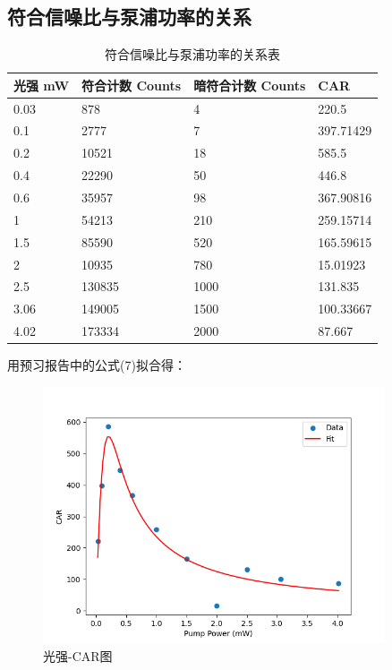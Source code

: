 \documentclass[a4paper,UTF8]{ctexart}
\begin{document}
\subsection{符合信噪比与泵浦功率的关系}

\begin{table}[H]
    \centering
    \caption{符合信噪比与泵浦功率的关系表}
    \begin{tabular}{|l|l|l|l|}
    \hline
        光强 mW & 符合计数 Counts & 暗符合计数 Counts & CAR \\ \hline
        0.03 & 878 & 4 & 220.5 \\ \hline
        0.1 & 2777 & 7 & 397.71429 \\ \hline
        0.2 & 10521 & 18 & 585.5 \\ \hline
        0.4 & 22290 & 50 & 446.8 \\ \hline
        0.6 & 35957 & 98 & 367.90816 \\ \hline
        1 & 54213 & 210 & 259.15714 \\ \hline
        1.5 & 85590 & 520 & 165.59615 \\ \hline
        2 & 10935 & 780 & 15.01923 \\ \hline
        2.5 & 130835 & 1000 & 131.835 \\ \hline
        3.06 & 149005 & 1500 & 100.33667 \\ \hline
        4.02 & 173334 & 2000 & 87.667 \\ \hline
    \end{tabular}
\end{table}

用预习报告中的公式(7)拟合得：

\begin{figure}[H]
    \centering
    \begin{minipage}[b]{0.9\textwidth}
        \centering
        \includegraphics[width=0.9\textwidth]{./ffig4.png}
        \caption{光强-CAR图}
    \end{minipage}
\end{figure}
\end{document}
